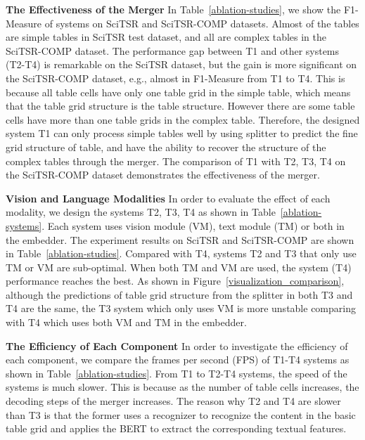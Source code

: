 \documentclass[review]{elsarticle}
\begin{document}
\textbf{The Effectiveness of the Merger} In Table~\ref{ablation-studies}, we show the F1-Measure of systems  on SciTSR and SciTSR-COMP datasets. Almost  of the tables are simple tables in SciTSR test dataset, and all are complex tables in the SciTSR-COMP dataset. The performance gap between T1 and other systems (T2-T4) is remarkable on the SciTSR dataset, but the gain is more significant on the SciTSR-COMP dataset, e.g., almost  in F1-Measure from T1 to T4. This is because all table cells have only one table grid in the simple table, which means that the table grid structure is the table structure. However there are some table cells have more than one table grids in the complex table. Therefore, the designed system T1 can only process simple tables well by using splitter to predict the fine grid structure of table, and  have the ability to recover the structure of the complex tables through the merger. The comparison of T1 with T2, T3, T4 on the SciTSR-COMP dataset demonstrates the effectiveness of the merger.

\textbf{Vision and Language Modalities} In order to evaluate the effect of each modality, we design the systems T2, T3, T4 as shown in Table~\ref{ablation-systems}.
Each system uses vision module (VM), text module (TM) or both in the embedder. The experiment results on SciTSR and SciTSR-COMP are shown in Table~\ref{ablation-studies}. Compared with T4, systems T2 and T3 that only use TM or VM are sub-optimal. When both TM and VM are used, the system (T4) performance reaches the best. As shown in Figure~\ref{visualization_comparison}, although the predictions of table grid structure from the splitter in both T3 and T4 are the same, the T3 system which only uses VM is more unstable comparing with T4 which uses both VM and TM in the embedder.

\textbf{The Efficiency of Each Component} In order to investigate the efficiency of each component, we compare the frames per second (FPS) of T1-T4 systems as shown in Table~\ref{ablation-studies}.  From T1 to T2-T4 systems, the speed of the systems is much slower. This is because as the number of table cells increases, the decoding steps of the merger increases. The reason why T2 and T4 are slower than T3 is that the former uses a recognizer to recognize the content in the basic table grid and applies the BERT to extract the corresponding textual features.
\end{document}
